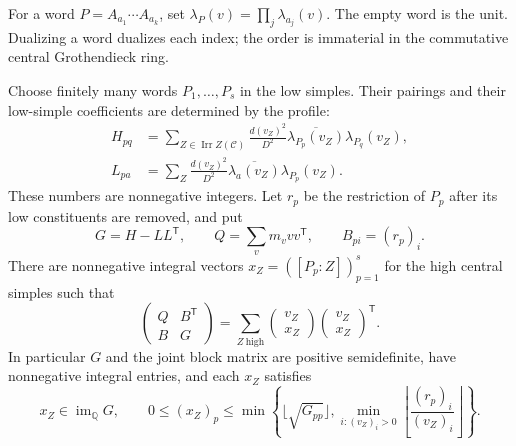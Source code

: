 For a word $P=A_{a_1}\cdots A_{a_k}$, set
$\lambda_P(v)=\prod_j\lambda_{a_j}(v)$. The empty word is the unit.
Dualizing a word dualizes each index; the order is immaterial in the
commutative central Grothendieck ring.

\begin{theorem}
\label{thm:joint-restriction-word-gram}
\label{prop:joint-low-product-gram}
Choose finitely many words $P_1,\ldots,P_s$ in the low simples. Their
pairings and their low-simple coefficients are determined by the profile:
\begin{align}
 H_{pq}
 &=\sum_{Z\in\operatorname{Irr}Z(\mathcal C)}
       \frac{d(v_Z)^2}{D^2}
       \overline{\lambda_{P_p}(v_Z)}\lambda_{P_q}(v_Z),
       \label{eq:unified-word-pairing}\\
 L_{pa}
 &=\sum_Z\frac{d(v_Z)^2}{D^2}
       \overline{\lambda_a(v_Z)}\lambda_{P_p}(v_Z).
       \label{eq:unified-word-low}
\end{align}
These numbers are nonnegative integers. Let $r_p$ be the restriction
of $P_p$ after its low constituents are removed, and put
\[
 G=H-LL^{\mathsf T},\qquad
 Q=\sum_v m_v vv^{\mathsf T},\qquad B_{pi}=(r_p)_i.
\]
There are nonnegative integral vectors
$x_Z=([P_p:Z])_{p=1}^s$ for the high central simples such that
\begin{equation}\label{eq:unified-joint-gram}
 \begin{pmatrix}Q&B^{\mathsf T}\\B&G\end{pmatrix}
 =\sum_{Z\ \mathrm{high}}
      \begin{pmatrix}v_Z\\x_Z\end{pmatrix}
      \begin{pmatrix}v_Z\\x_Z\end{pmatrix}^{\mathsf T}.
\end{equation}
In particular $G$ and the joint block matrix are positive semidefinite,
have nonnegative integral entries, and each $x_Z$ satisfies
\[
 x_Z\in\operatorname{im}_{\mathbb Q}G,
 \qquad
 0\le (x_Z)_p\le
 \min\left\{\lfloor\sqrt{G_{pp}}\rfloor,
       \min_{i:(v_Z)_i>0}
          \left\lfloor\frac{(r_p)_i}{(v_Z)_i}\right\rfloor\right\}.
\]
\end{theorem}
